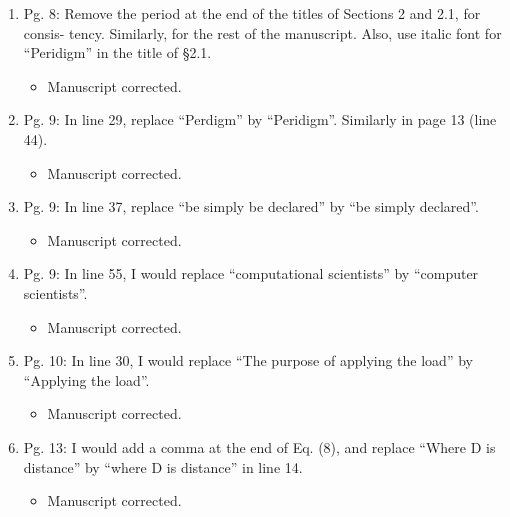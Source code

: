 \documentclass{article}
\begin{document}
\begin{enumerate}
 \item Pg. 8: Remove the period at the end of the titles of Sections 2 and 2.1, for consis-
tency. Similarly, for the rest of the manuscript. Also, use italic font for “Peridigm” in
the title of §2.1.

{\color{red}  
\begin{itemize}
     \item
 Manuscript corrected. 
  \end{itemize}}

 \item Pg. 9: In line 29, replace “Perdigm” by “Peridigm”. Similarly in page 13 (line 44).

{\color{red}  
\begin{itemize}
     \item
 Manuscript corrected. 
  \end{itemize}}

 \item Pg. 9: In line 37, replace “be simply be declared” by “be simply declared”.

{\color{red}  
\begin{itemize}
     \item
 Manuscript corrected. 
  \end{itemize}}

 \item Pg. 9: In line 55, I would replace “computational scientists” by “computer scientists”.

{\color{red}  
\begin{itemize}
     \item
 Manuscript corrected. 
  \end{itemize}}

 \item Pg. 10: In line 30, I would replace “The purpose of applying the load” by “Applying
the load”.

{\color{red}  
\begin{itemize}
     \item
 Manuscript corrected. 
  \end{itemize}}

 \item Pg. 13: I would add a comma at the end of Eq. (8), and replace “Where D is
distance” by “where D is distance” in line 14.

{\color{red}  
\begin{itemize}
     \item
 Manuscript corrected. 
  \end{itemize}}


\end{enumerate}
\end{document}
